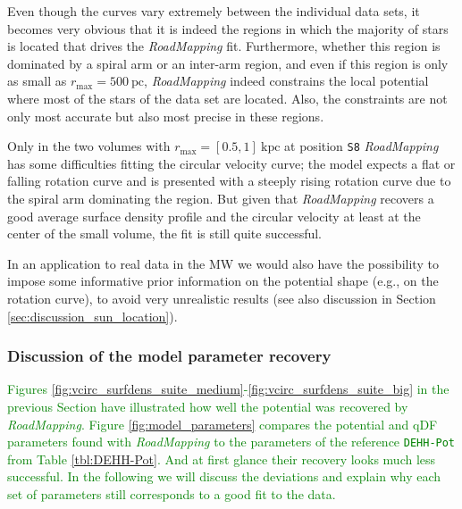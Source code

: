 \documentclass[iop,revtex4,numberedappendix,appendixfloats]{emulateapj}
\newcommand{\RM}{{\sl RoadMapping}}
\newcommand{\NEW}[1]{\textcolor{Green}{#1}}
\newcommand{\hiddenComment}[1]{}
\begin{document}
Even though the curves vary extremely between the individual data sets, it becomes very obvious that it is indeed the regions in which the majority of stars is located that drives the \RM{} fit. Furthermore, whether this region is dominated by a spiral arm or an inter-arm region, and even if this region is only as small as $r_\text{max}=500~\text{pc}$, \RM{} indeed constrains the local potential where most of the stars of the data set are located. Also, the constraints are not only most accurate but also most precise in these regions.

Only in the two volumes with $r_\text{max}=[0.5,1]~\text{kpc}$ at position \texttt{S8} \RM{} has some difficulties fitting the circular velocity curve; the model expects a flat or falling rotation curve and is presented with a steeply rising rotation curve due to the spiral arm dominating the region. But given that \RM{} recovers a good average surface density profile and the circular velocity at least at the center of the small volume, the fit is still quite successful. 

In an application to real data in the MW we would also have the possibility to impose some informative prior information on the potential shape (e.g., on the rotation curve), to avoid very unrealistic results (see also discussion in Section \ref{sec:discussion_sun_location}).

\hiddenComment{[TO DO: Jo writes: "It would be interesting to figure out a little more how we can determine whether we expect the fit to be strongly biased because we are using a volume that it sitting right on top of a massive spiral arm, although that is perhaps best kept for a later paper."]}

\subsubsection{Discussion of the model parameter recovery} \label{sec:parameter recovery}

\NEW{Figures \ref{fig:vcirc_surfdens_suite_medium}-\ref{fig:vcirc_surfdens_suite_big} in the previous Section have illustrated how well the potential was recovered by \RM{}. Figure \ref{fig:model_parameters} compares the potential and qDF parameters found with \RM{} to the parameters of the reference \texttt{DEHH-Pot} from Table \ref{tbl:DEHH-Pot}. And at first glance their recovery looks much less successful. In the following we will discuss the deviations and explain why each set of parameters still corresponds to a good fit to the data.}
\end{document}

